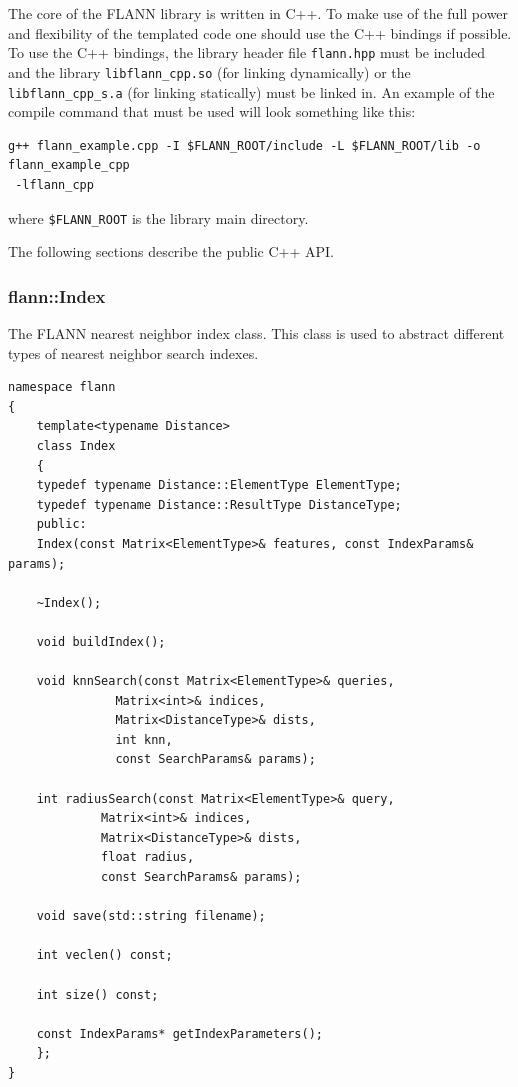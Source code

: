 \documentclass[letter,10pt]{article}
\begin{document}
The core of the FLANN library is written in C++. To make use of the full power 
and flexibility of the templated code one should use the C++ bindings if possible. 
To use the C++ bindings, the library header file \texttt{flann.hpp} must be included 
and the library \texttt{libflann\_cpp.so} (for linking dynamically) or
the \texttt{libflann\_cpp\_s.a} (for linking statically) must be linked in. An example
of the compile command that must be used will look something like this:
\begin{Verbatim}[fontsize=\footnotesize]
g++ flann_example.cpp -I $FLANN_ROOT/include -L $FLANN_ROOT/lib -o flann_example_cpp
 -lflann_cpp
\end{Verbatim}
where \texttt{\$FLANN\_ROOT} is the library main directory.

The following sections describe the public C++ API.

\subsubsection{flann::Index}
\label{sec:flann::Index}
The FLANN nearest neighbor index class. This class is used to abstract different
types of nearest neighbor search indexes.

\begin{Verbatim}[fontsize=\footnotesize,frame=single]
namespace flann
{
    template<typename Distance>
    class Index 
    {
	typedef typename Distance::ElementType ElementType;
	typedef typename Distance::ResultType DistanceType;
    public:
	Index(const Matrix<ElementType>& features, const IndexParams& params);

	~Index();

	void buildIndex();

	void knnSearch(const Matrix<ElementType>& queries, 
		       Matrix<int>& indices, 
		       Matrix<DistanceType>& dists, 
		       int knn, 
		       const SearchParams& params);

	int radiusSearch(const Matrix<ElementType>& query, 
			 Matrix<int>& indices, 
			 Matrix<DistanceType>& dists, 
			 float radius, 
			 const SearchParams& params);

	void save(std::string filename);

	int veclen() const;

	int size() const;

	const IndexParams* getIndexParameters();
    };
}
\end{Verbatim}
\end{document}
